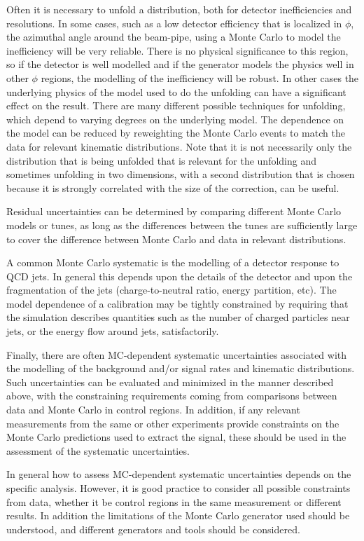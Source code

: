 Often it is necessary to unfold a distribution, both for detector
inefficiencies and resolutions.  In some cases, such as a low detector
efficiency that is localized in $\phi$, the azimuthal angle around the
beam-pipe, using a Monte Carlo to model the inefficiency will be very reliable.
There is no physical significance to this region, so if the detector is
well modelled and if the generator models the physics well in other
$\phi$ regions, the modelling of the inefficiency will be robust.  In
other cases the underlying physics of the model used to do the
unfolding can have a significant effect on the result.  There are many
different possible techniques for unfolding, which depend to varying
degrees on the underlying model. The dependence on the model can be
reduced by \eg reweighting the Monte Carlo events to match the data for relevant
kinematic distributions.
Note that it is not necessarily only the distribution that is being
unfolded that is relevant for the unfolding and sometimes unfolding in
two dimensions, with a second distribution that is chosen because it
is strongly correlated with the size of the correction, can be useful.

 Residual uncertainties can be determined by
comparing different Monte Carlo models or tunes, as long as the differences
between the tunes are sufficiently large to cover the difference
between Monte Carlo and data in relevant distributions.

A common Monte Carlo systematic is the modelling of a detector response to QCD
jets. In general this depends upon the details of the detector and upon
the fragmentation of the jets (charge-to-neutral ratio, energy
partition, etc). The model dependence of a calibration may be tightly
constrained by requiring that the simulation describes quantities such
as the number of charged particles near jets, or the energy flow around
jets, satisfactorily.

Finally, there are often MC-dependent systematic uncertainties
associated with the modelling of the background and/or signal rates and
kinematic distributions.  Such uncertainties can be evaluated and
minimized in the manner described above, with the constraining
requirements coming from comparisons between data and Monte Carlo in control
regions. In addition, if any relevant measurements from the same or other
experiments provide constraints on the Monte Carlo predictions used to extract
the signal, these should be used in the assessment of the systematic
uncertainties.

In general how to assess MC-dependent systematic uncertainties depends
on the specific analysis. However, it is good practice to consider all
possible constraints from data, whether it be control regions in the
same measurement or different results. In addition the limitations of
the Monte Carlo generator used should be understood, and different generators and tools
should be considered.

